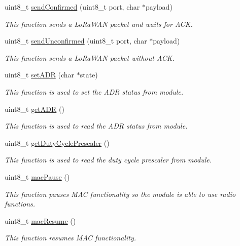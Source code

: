 \begin{DoxyCompactItemize}
uint8\+\_\+t \hyperlink{class_wasp_lo_ra_w_a_n_a59953e5c7fc93bf89570cc88f3976ab9}{send\+Confirmed} (uint8\+\_\+t port, char $\ast$payload)
\begin{DoxyCompactList}\small\item\em This function sends a Lo\+Ra\+W\+AN packet and waits for A\+CK. \end{DoxyCompactList}\item 
uint8\+\_\+t \hyperlink{class_wasp_lo_ra_w_a_n_aa0eda53f971c525e0375bf6425705dae}{send\+Unconfirmed} (uint8\+\_\+t port, char $\ast$payload)
\begin{DoxyCompactList}\small\item\em This function sends a Lo\+Ra\+W\+AN packet without A\+CK. \end{DoxyCompactList}\item 
uint8\+\_\+t \hyperlink{class_wasp_lo_ra_w_a_n_a0ce32dad81c1c4683dcdf1bda28b6711}{set\+A\+DR} (char $\ast$state)
\begin{DoxyCompactList}\small\item\em This function is used to set the A\+DR status from module. \end{DoxyCompactList}\item 
uint8\+\_\+t \hyperlink{class_wasp_lo_ra_w_a_n_a97f1860a5cbd2984ca695b572d05a6e8}{get\+A\+DR} ()
\begin{DoxyCompactList}\small\item\em This function is used to read the A\+DR status from module. \end{DoxyCompactList}\item 
uint8\+\_\+t \hyperlink{class_wasp_lo_ra_w_a_n_a97f908380a6d9957a888abda2a30be99}{get\+Duty\+Cycle\+Prescaler} ()
\begin{DoxyCompactList}\small\item\em This function is used to read the duty cycle prescaler from module. \end{DoxyCompactList}\item 
uint8\+\_\+t \hyperlink{class_wasp_lo_ra_w_a_n_a5a54dadb2d5a49af135069bfda53e93c}{mac\+Pause} ()
\begin{DoxyCompactList}\small\item\em This function pauses M\+AC functionality so the module is able to use radio functions. \end{DoxyCompactList}\item 
uint8\+\_\+t \hyperlink{class_wasp_lo_ra_w_a_n_aee5c255942407b5616efe774bca9d9b1}{mac\+Resume} ()
\begin{DoxyCompactList}\small\item\em This function resumes M\+AC functionality. \end{DoxyCompactList}\item 

\end{DoxyCompactItemize}

